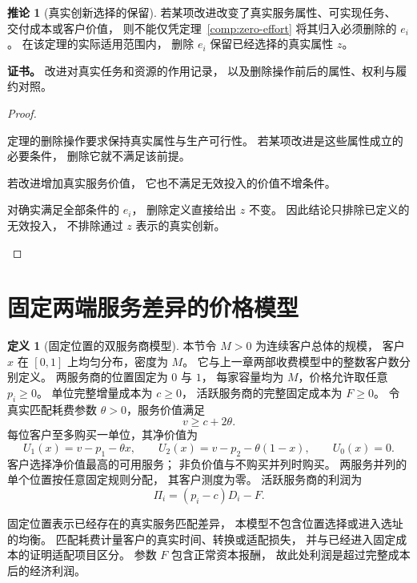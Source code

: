 \documentclass[UTF8,12pt,a4paper,openany,fontset=none,zihao=false]{ctexrep}
\theoremstyle{definition}
\newtheorem{definition}{定义}[chapter]
\newtheorem{corollary}{推论}[chapter]
\newenvironment{certificate}{\par\noindent\textbf{证书。}\ignorespaces}{\par}
\newcommand{\1}{\mathbf 1}
\begin{document}
\begin{corollary}[真实创新选择的保留]
\label{comp:innovation}
若某项改进改变了真实服务属性、可实现任务、
交付成本或客户价值，
则不能仅凭定理~\ref{comp:zero-effort}
将其归入必须删除的 \(e_i\)。
在该定理的实际适用范围内，
删除 \(e_i\) 保留已经选择的真实属性 \(z\)。
\end{corollary}
\begin{certificate}
改进对真实任务和资源的作用记录，
以及删除操作前后的属性、权利与履约对照。
\end{certificate}
\begin{proof}
\begin{semanticsteps}
\item 定理的删除操作要求保持真实属性与生产可行性。
若某项改进是这些属性成立的必要条件，
删除它就不满足该前提。
\item 若改进增加真实服务价值，
它也不满足无效投入的价值不增条件。
\item 对确实满足全部条件的 \(e_i\)，
删除定义直接给出 \(z\) 不变。
因此结论只排除已定义的无效投入，
不排除通过 \(z\) 表示的真实创新。
\end{semanticsteps}
\end{proof}

\section{固定两端服务差异的价格模型}

\begin{definition}[固定位置的双服务商模型]
\label{comp:hotelling-data}
本节令 \(M>0\) 为连续客户总体的规模，
客户 \(x\) 在 \([0,1]\) 上均匀分布，密度为 \(M\)。
它与上一章两部收费模型中的整数客户数分别定义。
两服务商的位置固定为 \(0\) 与 \(1\)，
每家容量均为 \(M\)，价格允许取任意 \(p_i\ge0\)。
单位完整增量成本为 \(c\ge0\)，
活跃服务商的完整固定成本为 \(F\ge0\)。
令真实匹配耗费参数 \(\theta>0\)，服务价值满足
\[
 v\ge c+2\theta.
\]
每位客户至多购买一单位，其净价值为
\[
 U_1(x)=v-p_1-\theta x,\qquad
 U_2(x)=v-p_2-\theta(1-x),\qquad U_0(x)=0.
\]
客户选择净价值最高的可用服务；
非负价值与不购买并列时购买。
两服务并列的单个位置按任意固定规则分配，
其客户测度为零。
活跃服务商的利润为
\[
 \Pi_i=(p_i-c)D_i-F.
\]
\end{definition}

固定位置表示已经存在的真实服务匹配差异，
本模型不包含位置选择或进入选址的均衡。
匹配耗费计量客户的真实时间、转换或适配损失，
并与已经进入固定成本的证明适配项目区分。
参数 \(F\) 包含正常资本报酬，
故此处利润是超过完整成本后的经济利润。
\end{document}
